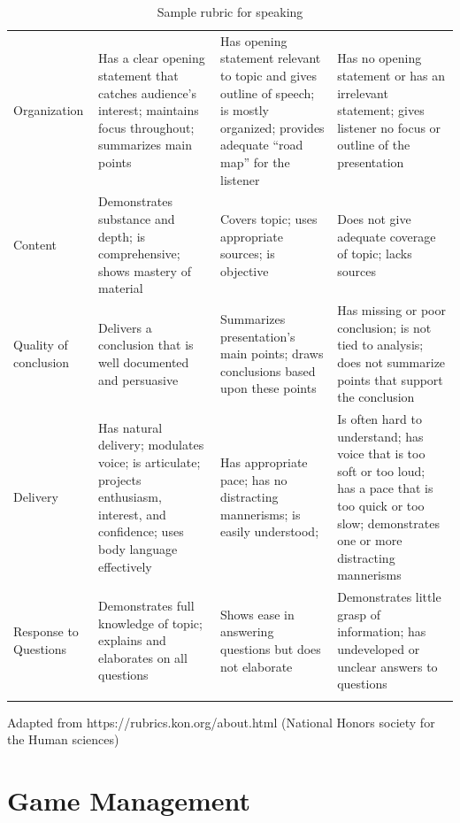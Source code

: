 \begin{refsection}
 \begin{longtable}[!t]{ | P{2cm} | P{3.5cm} | P{3.5cm} | P{3.5cm} |}
\hline
{} &  &  &  \\ \hline
Organization&
Has a clear opening statement that catches audience’s interest; maintains focus throughout; summarizes main points&
Has opening statement relevant to topic and gives outline of speech; is mostly organized; provides adequate “road map” for the listener&
Has no opening statement or has an irrelevant statement; gives listener no focus or outline of the presentation \\ \hline
Content&
Demonstrates substance and depth; is comprehensive; shows mastery of material&
Covers topic; uses appropriate sources; is objective&
Does not give adequate coverage of topic; lacks sources \\ \hline
Quality of conclusion&
Delivers a conclusion that is well documented and persuasive&
Summarizes presentation’s main points; draws conclusions based upon these points&
Has missing or poor conclusion; is not tied to analysis; does not summarize points that support the conclusion \\ \hline
Delivery&
Has natural delivery; modulates voice; is articulate; projects enthusiasm, interest, and confidence; uses body language effectively&
Has appropriate pace; has no distracting mannerisms; is easily understood; &
Is often hard to understand; has voice that is too soft or too loud; has a pace that is too quick or too slow; demonstrates one or more distracting mannerisms \\ \hline
Response to Questions&
Demonstrates full knowledge of topic; explains and elaborates on all questions&
Shows ease in answering questions but does not elaborate&
Demonstrates little grasp of information; has undeveloped or unclear answers to questions \\ \hline
\caption{Sample rubric for speaking}
\label{table: speakingrubric}
\end{longtable}


Adapted from https:\slash \slash rubrics.kon.org\slash about.html (National Honors society for the Human sciences) 

\pagebreak 

\chapter{Game Management}
\label{gamemanagement}


\end{refsection}
